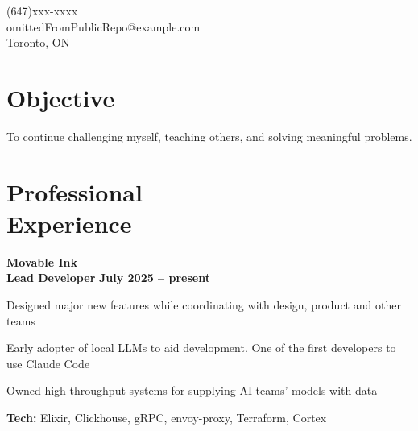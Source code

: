 \documentclass[margin,line]{resume}
\begin{document}
\sffamily %

{
	\sc
    \hfill (647)xxx-xxxx                  \vspace{0mm}\\\vspace{0mm}
    \hfill omittedFromPublicRepo@example.com            \vspace{0mm}\\\vspace{0mm}
    \hfill Toronto, ON                \vspace{0mm}\\\vspace{-10mm}
}

\begin{resume}

\vspace{1mm}

    \section{\mysidestyle \textbf{\large{O}\small{bjective}}}

	\hspace{-3mm}To continue challenging myself, teaching others, and solving meaningful problems.

\sectionline

    \section{\mysidestyle \textbf{\large{P}\small{rofessional\\Experience}}}

    \hspace{-3mm}\textbf{\listing Movable Ink} \vspace{2mm}\\\vspace{1mm}
    \hspace{1.2mm}\textbf{Lead Developer} \hfill \textbf{July 2025 -- present}\vspace{1mm}
    \begin{list2}
        \item Designed major new features while coordinating with design, product and other teams
        \vspace{1mm}
        \item Early adopter of local LLMs to aid development. One of the first developers to use Claude Code
        \vspace{1mm}
        \item Owned high-throughput systems for supplying AI teams' models with data
        \vspace{1mm}
        \item\textbf{Tech:} Elixir, Clickhouse, gRPC, envoy-proxy, Terraform, Cortex
    \end{list2}



\end{resume}
\end{document}
